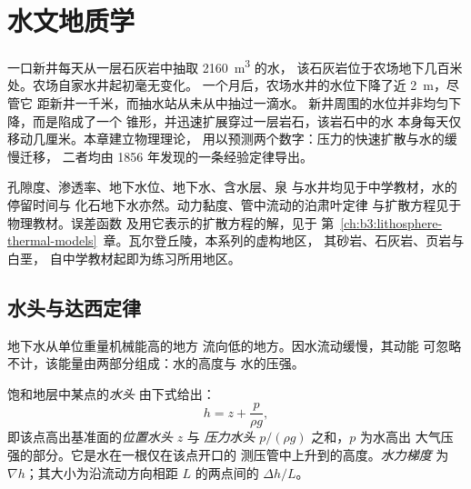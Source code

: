 \chapter{水文地质学}\label{ch:b3:hydrogeology}

一口新井每天从一层石灰岩中抽取 \qty{2160}{m^3} 的水，
该石灰岩位于农场地下几百米处。农场自家水井起初毫无变化。
一个月后，农场水井的水位下降了近 \qty{2}{m}，尽管它
距新井一千米，而抽水站从未从中抽过一滴水。
新井周围的水位并非均匀下降，而是陷成了一个
锥形，并迅速扩展穿过一层岩石，该岩石中的水
本身每天仅移动几厘米。本章建立物理理论，
用以预测两个数字：压力的快速扩散与水的缓慢迁移，
二者均由 1856 年发现的一条经验定律导出。

\begin{recall}
孔隙度、渗透率、地下水位、地下水、含水层、泉
与水井均见于中学教材，水的停留时间与
化石地下水亦然。动力黏度、管中流动的泊肃叶定律
与扩散方程见于物理教材。误差函数
及用它表示的扩散方程的解，见于
第~\ref{ch:b3:lithosphere-thermal-models}~章。瓦尔登丘陵，本系列的虚构地区，
其砂岩、石灰岩、页岩与白垩，
自中学教材起即为练习所用地区。
\end{recall}

\section{水头与达西定律}\label{sec:b3:hydrogeology:darcy}

地下水从单位重量机械能高的地方
流向低的地方。因水流动缓慢，其动能
可忽略不计，该能量由两部分组成：水的高度与
水的压强。

\begin{definition}[水头；水力梯度]\label{def:b3:hydrogeology:head}
饱和地层中某点的\emph{水头}
由下式给出：
\[
h = z + \frac{p}{\rho g} ,
\]
即该点高出基准面的\emph{位置水头} $z$ 与
\emph{压力水头} $p/(\rho g)$ 之和，$p$ 为水高出
大气压强的部分。它是水在一根仅在该点开口的
测压管中上升到的高度。\emph{水力梯度}
为 $\nabla h$；其大小为沿流动方向相距 $L$ 的两点间的
$\Delta h/L$。
\end{definition}

